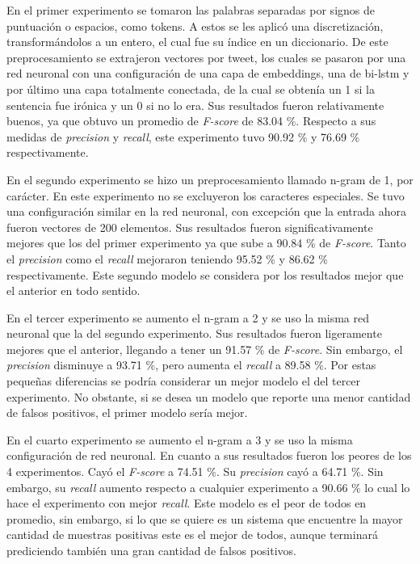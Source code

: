 \par En el primer experimento se tomaron las palabras separadas por signos de puntuación o espacios, como tokens. A estos se les aplicó una discretización, transformándolos a un entero, el cual fue su índice en un diccionario. De este preprocesamiento se extrajeron vectores por tweet, los cuales se pasaron por una red neuronal con una configuración de una capa de embeddings, una de \gls{bi-lstm} y por último una capa totalmente conectada, de la cual se obtenía un 1 si la sentencia fue irónica y un 0 si no lo era. Sus resultados fueron relativamente buenos, ya que obtuvo un promedio de \textit{F-score} de 83.04 \%. Respecto a sus medidas de \textit{precision} y \textit{recall}, este experimento tuvo 90.92 \% y 76.69 \% respectivamente.

\par En el segundo experimento se hizo un preprocesamiento llamado n-gram de 1, por carácter. En este experimento no se excluyeron los caracteres especiales. Se tuvo una configuración similar en la red neuronal, con excepción que la entrada ahora fueron vectores de 200 elementos. Sus resultados fueron significativamente mejores que los del primer experimento ya que sube a 90.84 \% de \textit{F-score}. Tanto el \textit{precision} como el \textit{recall} mejoraron teniendo 95.52 \% y 86.62 \% respectivamente. Este segundo modelo se considera por los resultados mejor que el anterior en todo sentido.

\par En el tercer experimento se aumento el n-gram a 2 y se uso la misma red neuronal que la del segundo experimento. Sus resultados fueron ligeramente mejores que el anterior, llegando a tener un 91.57 \% de \textit{F-score}. Sin embargo, el \textit{precision}
disminuye a 93.71 \%, pero aumenta el \textit{recall} a 89.58 \%. Por estas pequeñas diferencias se podría considerar un mejor modelo el del tercer experimento. No obstante, si se desea un modelo que reporte una menor cantidad de falsos positivos, el primer modelo sería mejor.

\par En el cuarto experimento se aumento el n-gram a 3 y se uso la misma configuración de red neuronal. En cuanto a sus resultados fueron los peores de los 4 experimentos. Cayó el \textit{F-score} a 74.51 \%. Su \textit{precision} cayó a 64.71 \%. Sin embargo, su \textit{recall} aumento respecto a cualquier experimento a 90.66 \% lo cual lo hace el experimento con mejor \textit{recall}. Este modelo es el peor de todos en promedio, sin embargo, si lo que se quiere es un sistema que encuentre la mayor cantidad de muestras positivas este es el mejor de todos, aunque terminará prediciendo también una gran cantidad de falsos positivos.

